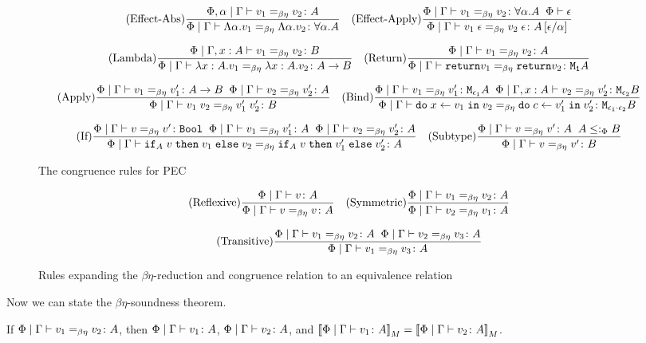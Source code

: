 \documentclass{Report}
\begin{document}
\begin{figure}[h!]\label{BetaEtaCongruence}
    \[
        (\text{Effect-Abs}) \frac{\Phi, \alpha\mid\Gamma \vdash v_1 =_{\beta\eta} v_2 \colon A}{\Phi\mid\Gamma \vdash \Lambda \alpha. v_1 =_{\beta\eta} \Lambda \alpha. v_2 \colon \forall \alpha. A}
        \quad
        (\text{Effect-Apply}) \frac{\Phi\mid\Gamma \vdash v_1 =_{\beta\eta} v_2 \colon \forall \alpha. A\;\;\Phi\vdash \epsilon}{\Phi\mid\Gamma \vdash v_1\;\epsilon =_{\beta\eta} v_2\;\epsilon \colon A\left[\epsilon / \alpha\right]}
    \]

    \[
        (\text{Lambda}) \frac{\Phi\mid\Gamma, x: A \vdash v_1 =_{\beta\eta} v_2 \colon B}{\Phi\mid\Gamma \vdash \lambda x : A. v_1 =_{\beta\eta} \lambda x : A. v_2 \colon A\rightarrow B}
        \quad
        (\text{Return}) \frac{\Phi\mid\Gamma \vdash v_1 =_{\beta\eta} v_2 \colon A}{\Phi\mid\Gamma \vdash \texttt{return} v_1 =_{\beta\eta} \texttt{return} v_2 \colon \texttt{M}_{\texttt{1}}{A}}
    \]

    \[
        (\text{Apply}) \frac{\Phi\mid\Gamma \vdash v_1 =_{\beta\eta} v_1' \colon A\rightarrow B\;\;\Phi\mid\Gamma \vdash v_2 =_{\beta\eta} v_2' \colon A}{\Phi\mid\Gamma \vdash v_1\; v_2 =_{\beta\eta} v_1'\; v_2' \colon B}
        \quad   
        (\text{Bind}) \frac{\Phi\mid\Gamma \vdash v_1 =_{\beta\eta} v_1' \colon \texttt{M}_{\epsilon_1}{A} \;\; \Phi\mid\Gamma, x: A \vdash v_2 =_{\beta\eta} v_2' \colon \texttt{M}_{\epsilon_2}{B}}{\Phi\mid\Gamma \vdash \texttt{do}\; x \leftarrow v_1 \;\texttt{in}\; v_2 =_{\beta\eta} \texttt{do}\; c \leftarrow v_1' \;\texttt{in}\; v_2' \colon \texttt{M}_{\epsilon_1 \cdot \epsilon_2}{B}} 
    \]

    \[
        (\text{If}) \frac{\Phi\mid\Gamma \vdash v =_{\beta\eta} v' \colon \texttt{Bool} \;\; \Phi\mid\Gamma \vdash v_1 =_{\beta\eta} v_1' \colon A\;\;\Phi\mid\Gamma \vdash v_2 =_{\beta\eta} v_2' \colon A}{\Phi\mid\Gamma \vdash \texttt{if}_{A}\; v\; \texttt{then}\; v_1 \;\texttt{else} \; v_2 =_{\beta\eta} \texttt{if}_{A}\; v\; \texttt{then}\; v_1' \;\texttt{else} \; v_2' \colon A}
        \quad    
        (\text{Subtype}) \frac{\Phi\mid\Gamma \vdash v =_{\beta\eta} v' \colon A \;\; A \leq:_\Phi B}{\Phi\mid\Gamma \vdash v =_{\beta\eta} v' \colon B}
    \]
    \caption{The congruence rules for PEC}
\end{figure}

\begin{figure}\label{BetaEtaEquivalence}
    \[
        (\text{Reflexive}) \frac{\Phi\mid\Gamma \vdash v \colon A}{\Phi\mid\Gamma \vdash v =_{\beta\eta} v \colon A}
        \quad
        (\text{Symmetric}) \frac{\Phi\mid\Gamma \vdash v_1 =_{\beta\eta} v_2 \colon A}{\Phi\mid\Gamma \vdash v_2 =_{\beta\eta} v_1 \colon A}
    \]

    \[
        (\text{Transitive}) \frac{\Phi\mid\Gamma \vdash v_1 =_{\beta\eta} v_2 \colon A\;\;\Phi\mid\Gamma \vdash v_2 =_{\beta\eta} v_3 \colon A}{\Phi\mid\Gamma \vdash v_1 =_{\beta\eta} v_3 \colon A}
    \]
    \caption{Rules expanding the $\beta\eta$-reduction and congruence relation to an equivalence relation}
\end{figure}


Now we can state the $\beta\eta$-soundness theorem. 

\begin{theorem}[Soundness]
    If $\Phi\mid\Gamma \vdash v_1 =_{\beta\eta} v_2 \colon A$, then $\Phi\mid\Gamma \vdash v_1 \colon A$, $\Phi\mid\Gamma \vdash v_2 \colon A$, and ${\bf [\![}\Phi\mid\Gamma \vdash v_1 \colon A{\bf ]\!]}_M = {\bf [\![}\Phi\mid\Gamma \vdash v_2 \colon A{\bf ]\!]}_M$.
\end{theorem}
\end{document}
